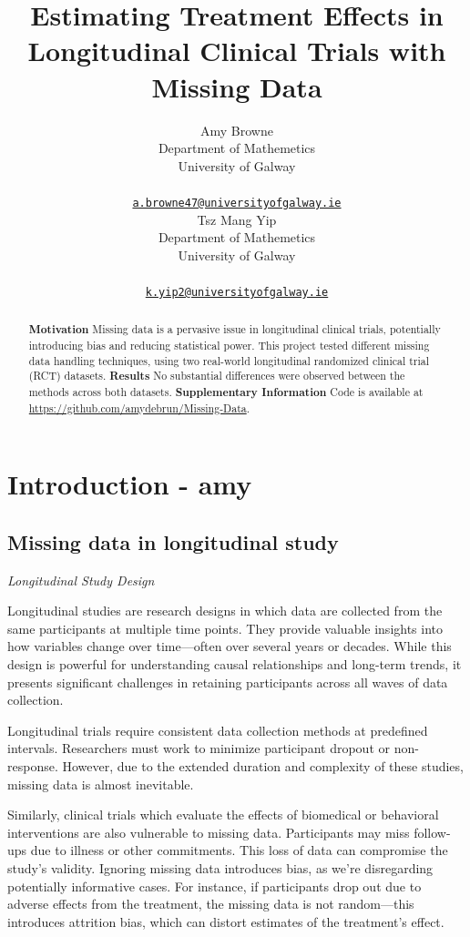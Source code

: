 \documentclass{article}
\title{Estimating Treatment Effects in Longitudinal Clinical Trials with
Missing Data}
\author{
    Amy Browne
   \\
    Department of Mathemetics \\
    University of Galway \\
   \\
  \texttt{\href{mailto:a.browne47@universityofgalway.ie}{\nolinkurl{a.browne47@universityofgalway.ie}}} \\
   \And
    Tsz Mang Yip
   \\
    Department of Mathemetics \\
    University of Galway \\
   \\
  \texttt{\href{mailto:k.yip2@universityofgalway.ie}{\nolinkurl{k.yip2@universityofgalway.ie}}} \\
  }
\begin{document}
\maketitle


\begin{abstract}
\textbf{Motivation} Missing data is a pervasive issue in longitudinal
clinical trials, potentially introducing bias and reducing statistical
power. This project tested different missing data handling techniques,
using two real-world longitudinal randomized clinical trial (RCT)
datasets. \textbf{Results} No substantial differences were observed
between the methods across both datasets.
\textbf{Supplementary Information} Code is available at
\url{https://github.com/amydebrun/Missing-Data}.
\end{abstract}


\newpage

\section{Introduction - amy}\label{introduction---amy}

\subsection{Missing data in longitudinal
study}\label{missing-data-in-longitudinal-study}

\emph{Longitudinal Study Design}

Longitudinal studies are research designs in which data are collected
from the same participants at multiple time points. They provide
valuable insights into how variables change over time---often over
several years or decades. While this design is powerful for
understanding causal relationships and long-term trends, it presents
significant challenges in retaining participants across all waves of
data collection.

Longitudinal trials require consistent data collection methods at
predefined intervals. Researchers must work to minimize participant
dropout or non-response. However, due to the extended duration and
complexity of these studies, missing data is almost inevitable.

Similarly, clinical trials which evaluate the effects of biomedical or
behavioral interventions are also vulnerable to missing data.
Participants may miss follow-ups due to illness or other commitments.
This loss of data can compromise the study's validity. Ignoring missing
data introduces bias, as we're disregarding potentially informative
cases. For instance, if participants drop out due to adverse effects
from the treatment, the missing data is not random---this introduces
attrition bias, which can distort estimates of the treatment's effect.
\end{document}
